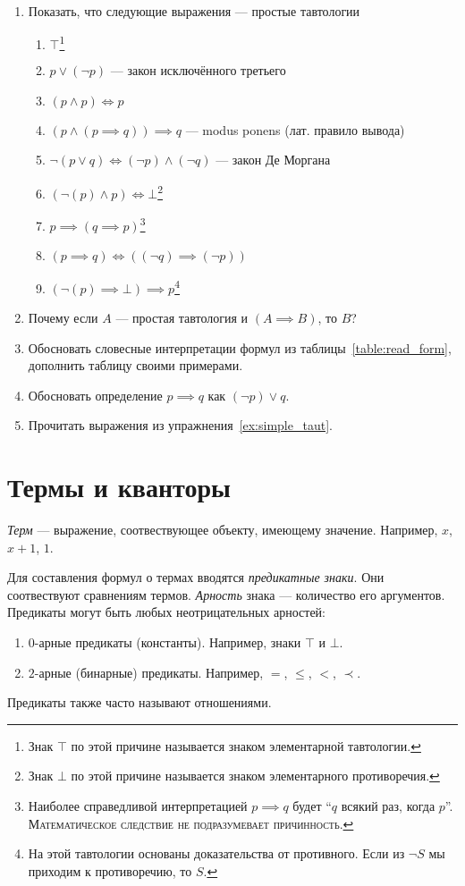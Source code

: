 \begin{enumerate}
	\item{}Показать, что следующие выражения --- простые тавтологии\label{ex:simple_taut}
	\begin{enumerate}
		\item{}$\top$\footnote{Знак $\top$ по этой причине называется
			знаком элементарной тавтологии.}
		\item{}$p\lor (\lnot p)$ --- закон исключённого третьего
		\item{}$(p\land p)\iff p$
		\item{}$(p\land (p\implies q))\implies q$ --- modus ponens (лат. правило вывода)
		\item{}$\lnot(p\lor q)\iff (\lnot p)\land (\lnot q)$ --- закон Де Моргана
		\item{}$(\lnot(p)\land p)\iff\bot$\footnote{
			Знак $\bot$ по этой причине называется
			знаком элементарного противоречия.}
		\item{}$p\implies (q\implies p)$\footnote{
			Наиболее справедливой интерпретацией ${p\implies q}$ будет
			``$q$ всякий раз, когда $p$''.
			\textsc{Математическое следствие не подразумевает причинность.}
		}
		\item{}${(p\implies q)\iff ((\lnot q)\implies (\lnot p))}$
		\item{}$(\lnot(p)\implies\bot)\implies p$\footnote[][1mm]{
			На этой тавтологии основаны
			доказательства от противного. Если из $\lnot S$ мы приходим
			к противоречию, то $S$.}
	\end{enumerate}
	\item{}Почему если $A$ --- простая тавтология и $(A\implies B)$, то $B$?
	\item{}Обосновать словесные интерпретации формул из таблицы~\ref{table:read_form},
	дополнить таблицу своими примерами.
	\item{}Обосновать определение $p\implies q$ как $(\lnot p)\lor q$.
	\item{}Прочитать выражения из упражнения~\ref{ex:simple_taut}.
\end{enumerate}

\pagebreak

\section{Термы и кванторы}

 {\it Терм} --- выражение, соотвествующее объекту, имеющему значение.
Например, $x$, $x+1$, $1$.

Для составления формул о термах вводятся {\it предикатные знаки}.
Они соотвествуют сравнениям термов.
{\it Арность} знака --- количество его аргументов.
Предикаты могут быть любых неотрицательных арностей:
\begin{enumerate}
	\item{}$0$-арные предикаты (константы). Например,
	знаки $\top$ и $\bot$.

	\item{}$2$-арные (бинарные) предикаты. Например,
	$=$, $\leq$, $<$, $\prec$.
\end{enumerate}
Предикаты также часто называют отношениями.

